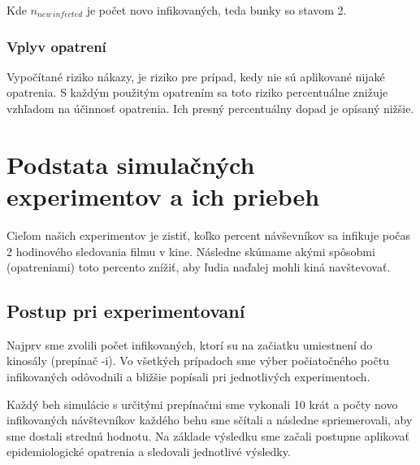 \documentclass[a4paper, 11pt]{article}
\begin{document}
        Kde $n_{new\,infected}$ je počet novo infikovaných, teda bunky so stavom 2.
        
        \subsubsection{Vplyv opatrení} Vypočítané riziko nákazy, je riziko pre prípad, kedy nie sú aplikované nijaké opatrenia. S každým použitým opatrením sa toto riziko percentuálne znižuje vzhľadom na účinnosť opatrenia. Ich presný percentuálny dopad je opísaný nižšie.
        
    \section{Podstata simulačných experimentov a ich priebeh}
        \par Cieľom našich experimentov je zistiť, koľko percent návševníkov sa infikuje počas 2 hodinového sledovania filmu v kine. Následne skúmame akými spôsobmi (opatreniami) toto percento znížiť, aby ľudia naďalej mohli kiná navštevovať.
        
        \subsection{Postup pri experimentovaní}
        Najprv sme zvolili počet infikovaných, ktorí su na začiatku umiestnení do kinosály (prepínač -i). Vo všetkých prípadoch sme výber počiatočného počtu infikovaných odôvodnili a bližšie popísali pri jednotlivých experimentoch.
        \par Každý beh simulácie s určitými prepínačmi sme vykonali 10 krát a počty novo infikovaných návštevníkov každého behu sme sčítali a následne spriemerovali, aby sme dostali strednú hodnotu. Na základe výsledku sme začali postupne aplikovať epidemiologické opatrenia a sledovali jednotlivé výsledky.
        
\end{document}
